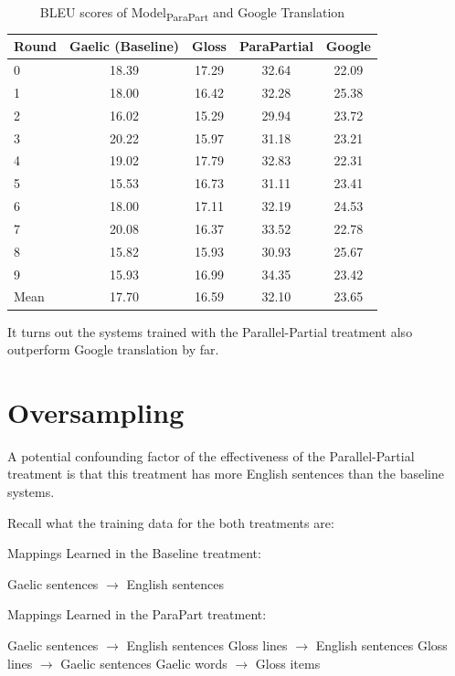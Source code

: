 \documentclass[final]{ua-thesis}
\numberwithin{equation}{section}
\begin{document}
\begin{table}[ht]
\centering
\begin{tabular}{lcccc}
  \hline
Round & Gaelic (Baseline) & Gloss & ParaPartial & Google \\ 
  \hline
0 & 18.39 & 17.29 & 32.64 & 22.09 \\ 
  1 & 18.00 & 16.42 & 32.28 & 25.38 \\ 
  2 & 16.02 & 15.29 & 29.94 & 23.72 \\ 
  3 & 20.22 & 15.97 & 31.18 & 23.21 \\ 
  4 & 19.02 & 17.79 & 32.83 & 22.31 \\ 
  5 & 15.53 & 16.73 & 31.11 & 23.41 \\ 
  6 & 18.00 & 17.11 & 32.19 & 24.53 \\ 
  7 & 20.08 & 16.37 & 33.52 & 22.78 \\ 
  8 & 15.82 & 15.93 & 30.93 & 25.67 \\ 
  9 & 15.93 & 16.99 & 34.35 & 23.42 \\ 
   \hline
Mean & 17.70 & 16.59 & 32.10 & 23.65 \\ 
   \hline
\end{tabular}
\caption{BLEU scores of Model\textsubscript{ParaPart} and Google Translation} 
\label{Table:google}
\end{table}
It turns out the systems trained with the Parallel-Partial treatment also outperform Google translation by far.   

\section{Oversampling}
A potential confounding factor of the effectiveness of the Parallel-Partial treatment is that this treatment has more English sentences than the baseline systems. 

Recall what the training data for the both treatments are: 

\begin{exe}
	\ex Mappings Learned in the Baseline treatment:
	\begin{xlist}
		\ex Gaelic sentences $\rightarrow$ English sentences
	\end{xlist}	
	\ex Mappings Learned in the ParaPart treatment:
	\begin{xlist}
		\ex \label{over1} Gaelic sentences $\rightarrow$ English sentences
		\ex \label{over2} Gloss lines $\rightarrow$ English sentences
		\ex Gloss lines $\rightarrow$ Gaelic sentences
		\ex Gaelic words $\rightarrow$ Gloss items
	\end{xlist}	
\end{exe}    
\end{document}
